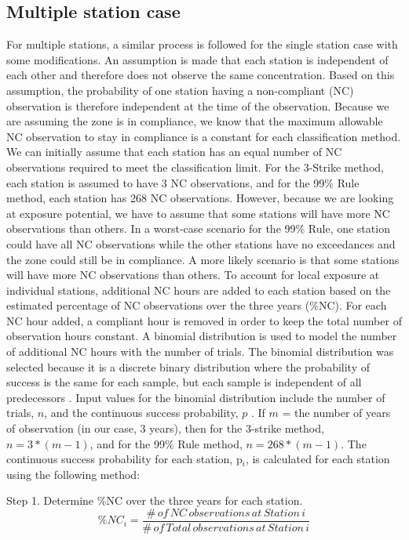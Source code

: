 \subsection{Multiple station case}
For multiple stations, a similar process is followed for the single station case with some modifications. An assumption is made that each station is independent of each other and therefore does not observe the same concentration. Based on this assumption, the probability of one station having a non-compliant (NC) observation is therefore independent at the time of the observation. Because we are assuming the zone is in compliance, we know that the maximum allowable NC observation to stay in compliance is a constant for each classification method. We can initially assume that each station has an equal number of NC observations required to meet the classification limit. For the 3-Strike method, each station is assumed to have 3 NC observations, and for the 99\% Rule method, each station has 268 NC observations. However, because we are looking at exposure potential, we have to assume that some stations will have more NC observations than others. In a worst-case scenario for the 99\% Rule, one station could have all NC observations while the other stations have no exceedances and the zone could still be in compliance. A more likely scenario is that some stations will have more NC observations than others. To account for local exposure at individual stations, additional NC hours are added to each station based on the estimated percentage of NC observations over the three years (\%NC). For each NC hour added, a compliant hour is removed in order to keep the total number of observation hours constant. A binomial distribution is used to model the number of additional NC hours with the number of trials. The binomial distribution was selected because it is a  discrete binary distribution where the probability of success is the same for each sample, but each sample is independent of all predecessors \citep{George2015}. Input values for the binomial distribution include the number of trials, $n$, and the continuous success probability, $p$ \citep{Palisades2016}.  If $m$ = the number of years of observation (in our case, 3 years), then for the 3-strike method, $n = 3*(m{-}1)$, and for the 99\% Rule method, $n = 268*(m{-}1)$. The continuous success probability for each station, p$_{i}$, is calculated for each station using the following method:

Step 1. Determine \%NC over the three years for each station. 
%
\begin{equation}
\label{eq11:step1}
\%NC_{i}=\frac{\#\, of\, NC\, observations\, at\, Station\, i}{\#\, of\, Total\, observations\, at\, Station\, i}
\end{equation}

